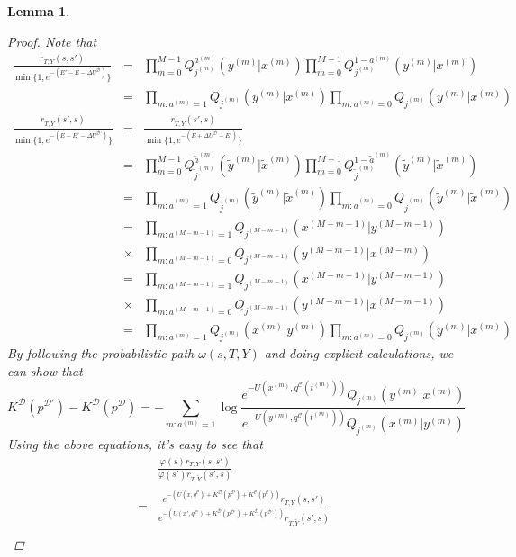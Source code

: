 \documentclass{article}
\newcommand{\cald}{\mathcal{D}}
\newcommand{\calc}{\mathcal{C}}
\newtheorem{lemma}{Lemma}
\begin{document}
\begin{lemma}
\begin{proof}
Note that
\begin{eqnarray*}
	\frac{r_{T, Y} (s, s')}{\min\{1, e^{-(E' - E - \Delta U^\cald)}\}} & = & \prod_{m = 0}^{M - 1} Q_{j^{(m)}}^{a^{(m)}} (y^{(m)} |x^{(m)}) \prod_{m = 0}^{M - 1} Q_{j^{(m)}}^{1 - a^{(m)}} (y^{(m)} |x^{(m)})\\
  & = & \prod_{m : a^{(m)} = 1} Q_{j^{(m)}} (y^{(m)} |x^{(m)}) \prod_{m : a^{(m)} = 0} Q_{j^{(m)}} (y^{(m)} |x^{(m)})\\
\frac{r_{T, \tilde{Y}} (s', s)}{\min\{1, e^{-(E - E' - \Delta U^{\cald\prime})}\}} & = &  \frac{r_{T, \tilde{Y}} (s', s)}{\min\{1, e^{-(E + \Delta U^{\cald} - E' )}\}} \\
& = & \prod_{m = 0}^{M - 1}
  Q_{\tilde{j}^{(m)}}^{\tilde{a}^{(m)}} (\tilde{y}^{(m)} | \tilde{x}^{(m)})
  \prod_{m = 0}^{M - 1} Q_{\tilde{j}^{(m)}}^{1 - \tilde{a}^{(m)}}
  (\tilde{y}^{(m)} | \tilde{x}^{(m)})\\
  & = & \prod_{m : \tilde{a}^{(m)} = 1} Q_{\tilde{j}^{(m)}} (\tilde{y}^{(m)}
  | \tilde{x}^{(m)}) \prod_{m : \tilde{a}^{(m)} = 0} Q_{\tilde{j}^{(m)}}
  (\tilde{y}^{(m)} | \tilde{x}^{(m)})\\
  & = & \prod_{m : a^{(M - m - 1)} = 1} Q_{j^{(M - m - 1)}} (x^{(M - m - 1)}
  |y^{(M - m - 1)})\\
  & \times & \prod_{m : a^{(M - m - 1)} = 0} Q_{j^{(M - m - 1)}} (y^{(M - m -
  1)} |x^{(M - m)})\\
  & = & \prod_{m : a^{(M - m - 1)} = 1} Q_{j^{(M - m - 1)}} (x^{(M - m - 1)}
  |y^{(M - m - 1)})\\
  & \times & \prod_{m : a^{(M - m - 1)} = 0} Q_{j^{(M - m - 1)}} (y^{(M - m -
  1)} |x^{(M - m - 1)})\\
  & = & \prod_{m : a^{(m)} = 1} Q_{j^{(m)}} (x^{(m)} |y^{(m)}) \prod_{m : a^{(m)} = 0} Q_{j^{(m)}} (y^{(m)} |x^{(m)})
\end{eqnarray*}
By following the probabilistic path $\omega (s, T, Y)$ and doing explicit calculations, we can show that
\[ K^{\cald}(p^{\cald\prime}) - K^{\cald}(p^{\cald}) = -\sum_{m: a^{(m)} = 1} \log \frac{e^{-U(x^{(m)}, q^\calc(t^{(m)}))}Q_{j^{(m)}}(y^{(m)} | x^{(m)})}{e^{-U(y^{(m)}, q^\calc(t^{(m)}))}Q_{j^{(m)}}(x^{(m)} | y^{(m)})} \]
Using the above equations, it's easy to see that
\begin{align*}
 &\frac{\varphi (s) r_{T, Y} (s, s')}{\varphi (s') r_{T, \tilde{Y}} (s', s)}\\
	= & \frac{e^{-(U(x, q^\calc) + K^\cald(p^\cald) + K^\calc(p^\calc))}r_{T,Y}(s, s')}{e^{-(U(x', q^{\calc\prime}) + K^\cald(p^{\cald\prime}) + K^\cald(p^{\cald\prime}))}r_{T, \tilde{Y}}(s', s)}\\

\end{align*}
\end{proof}
\end{lemma}
\end{document}
